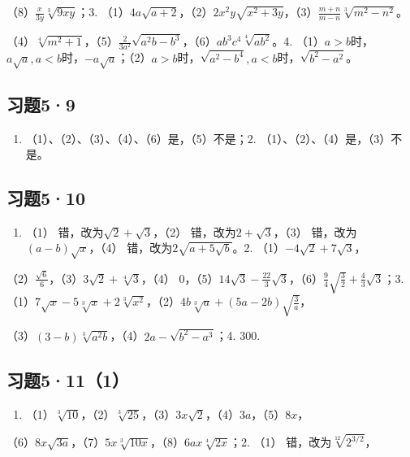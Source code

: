 （8）\(\frac{x}{3y}\sqrt[3]{9xy}\)；3.
（1）\(4a\sqrt{a + 2}\)，（2）\(2x^{2}y\sqrt{x^{2} + 3y}\)，（3）\(\frac{m + n}{m - n}\sqrt[3]{m^2 - n^2}\)。

（4）\(\sqrt[4]{m^2 + 1}\)，（5）\(\frac{2}{3a^2}\sqrt{a^2b - b^3}\)，（6）\(ab^{3}c^4\sqrt[4]{ab^2}\)。4.
（1）\(a > b\)时，\(a\sqrt{a}, a < b\)时，\(-a\sqrt{a}\)；（2）\(a > b\)时，\(\sqrt{a^2 - b^4}, a < b\)时，\(\sqrt{b^2 - a^2}\)。

\subsection{习题5·9}

\begin{enumerate}
\item
  （1）、（2）、（3）、（4）、（6）是，（5）不是；2.
  （1）、（2）、（4）是，（3）不是。
\end{enumerate}

\subsection{习题5·10}

\begin{enumerate}
\item
  （1） 错，改为\(\sqrt{2} + \sqrt{3}\)，（2）
  错，改为\(2 + \sqrt{3}\)，（3） 错，改为\((a - b)\sqrt{x}\)，（4）
  错，改为\(2\sqrt{a + 5\sqrt{b}}\)。2.
  （1）\(-4\sqrt{2} + 7\sqrt{3}\)，
\end{enumerate}

（2）\(\frac{\sqrt{6}}{6}\)，（3）\(3\sqrt{2} + \sqrt[4]{3}\)，（4）
0，（5）\(14\sqrt{3} - \frac{22}{3}\sqrt{3}\)，（6）\(\frac{9}{4}\sqrt{\frac{3}{2}} + \frac{4}{3}\sqrt{3}\)；3.
（1）\(7\sqrt{x} - 5\sqrt[3]{x} + 2\sqrt[3]{x^2}\)，（2）\(4b\sqrt[3]{a} + (5a - 2b)\sqrt{\frac{3}{a}}\)，

（3）\((3 - b)\sqrt[3]{a^2b}\)，（4）\(2a - \sqrt{b^2 - a^3}\)；4. 300.

\subsection{习题5·11（1）}

\begin{enumerate}
\item
  （1）\(\sqrt[3]{10}\)，（2）\(\sqrt[3]{25}\)，（3）\(3x\sqrt{2}\)，（4）\(3a\)，（5）\(8x\)，
\end{enumerate}

（6）\(8x\sqrt{3a}\)，（7）\(5x\sqrt[3]{10x}\)，（8）\(6ax\sqrt[4]{2x}\)；2.
（1） 错，改为\(\sqrt[12]{2^{3/2}}\)，

